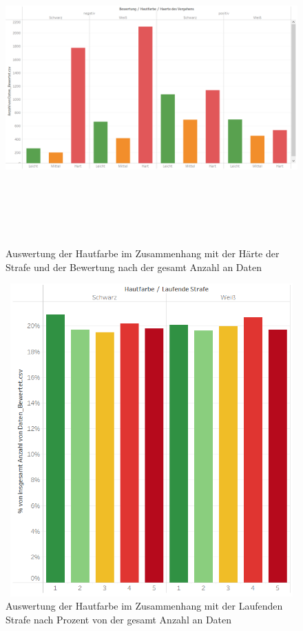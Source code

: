 \documentclass[a4paper,12pt]{report}
\begin{document}
\begin{figure}[!h]
    \centering
    \includegraphics[width=16cm,height=12cm]{Diagramme/SZ1_Tab6.PNG}
    \caption{Auswertung der Hautfarbe im Zusammenhang mit der Härte der Strafe und der Bewertung nach der gesamt Anzahl an Daten}
    \label{fig:SZ1Tab6}
\end{figure}

\begin{figure}[!h]
    \centering
    \includegraphics[width=16cm,height=12cm]{Diagramme/SZ1_Tab7.PNG}
    \caption{Auswertung der Hautfarbe im Zusammenhang mit der Laufenden Strafe nach Prozent von der gesamt Anzahl an Daten}
    \label{fig:SZ1Tab7}
\end{figure}
\end{document}
